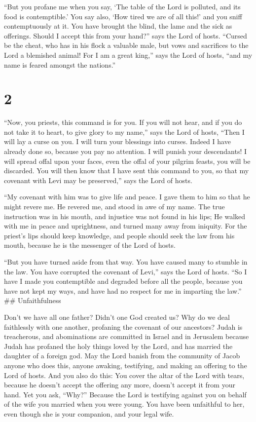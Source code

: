  ``But you profane me when you say, `The table of the Lord
is polluted, and its food is contemptible.'  You say also,
`How tired we are of all this!' and you sniff contemptuously at it. You
have brought the blind, the lame and the sick as offerings. Should I
accept this from your hand?'' says the Lord of hosts. 
``Cursed be the cheat, who has in his flock a valuable male, but vows
and sacrifices to the Lord a blemished animal! For I am a great king,''
says the Lord of hosts, ``and my name is feared amongst the nations.''

\hypertarget{section-1}{%
\section{2}\label{section-1}}

 ``Now, you priests, this command is for you. 
If you will not hear, and if you do not take it to heart, to give glory
to my name,'' says the Lord of hosts, ``Then I will lay a curse on you.
I will turn your blessings into curses. Indeed I have already done so,
because you pay no attention.  I will punish your
descendants! I will spread offal upon your faces, even the offal of your
pilgrim feasts, you will be discarded.  You will then know
that I have sent this command to you, so that my covenant with Levi may
be preserved,'' says the Lord of hosts.

 ``My covenant with him was to give life and peace. I gave
them to him so that he might revere me. He revered me, and stood in awe
of my name.  The true instruction was in his mouth, and
injustice was not found in his lips; He walked with me in peace and
uprightness, and turned many away from iniquity.  For the
priest's lips should keep knowledge, and people should seek the law from
his mouth, because he is the messenger of the Lord of hosts.

 ``But you have turned aside from that way. You have caused
many to stumble in the law. You have corrupted the covenant of Levi,''
says the Lord of hosts.  ``So I have I made you contemptible
and degraded before all the people, because you have not kept my ways,
and have had no respect for me in imparting the law.'' 
\#\# Unfaithfulness

Don't we have all one father? Didn't one God created us? Why do we deal
faithlessly with one another, profaning the covenant of our ancestors?
 Judah is treacherous, and abominations are committed in
Israel and in Jerusalem because Judah has profaned the holy things loved
by the Lord, and has married the daughter of a foreign god.
 May the Lord banish from the community of Jacob anyone who
does this, anyone awaking, testifying, and making an offering to the
Lord of hosts.  And you also do this: You cover the altar
of the Lord with tears, because he doesn't accept the offering any more,
doesn't accept it from your hand.  Yet you ask, ``Why?''
Because the Lord is testifying against you on behalf of the wife you
married when you were young. You have been unfaithful to her, even
though she is your companion, and your legal wife.

